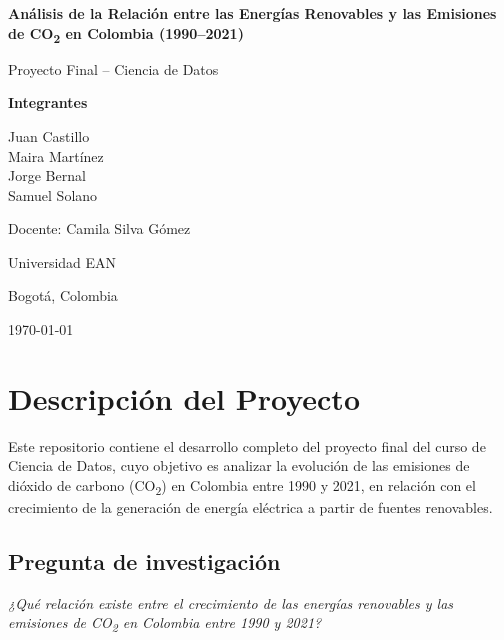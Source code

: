 \documentclass[11pt]{article}
\begin{document}
\begin{titlepage}
    \centering
    \vspace*{2cm}
    {\Huge\bfseries\color{primario} Análisis de la Relación entre las Energías Renovables y las Emisiones de CO\textsubscript{2} en Colombia (1990--2021)\par}
    \vspace{1.5cm}
    {\Large Proyecto Final -- Ciencia de Datos\par}
    \vspace{2cm}
    {\large\bfseries Integrantes\par}
    \vspace{0.3cm}
    {\large
    Juan Castillo \\
    Maira Martínez \\
    Jorge Bernal \\
    Samuel Solano \par}
    \vspace{2cm}
    {\large Docente: Camila Silva Gómez\par}
    \vspace{0.3cm}
    {\large Universidad EAN\par}
    \vspace{0.3cm}
    {\large Bogotá, Colombia \par}
    \vfill
    {\large \today\par}
\end{titlepage}

\section{Descripción del Proyecto}

Este repositorio contiene el desarrollo completo del proyecto final del curso de Ciencia de Datos, cuyo objetivo es analizar la evolución de las emisiones de dióxido de carbono (CO\textsubscript{2}) en Colombia entre 1990 y 2021, en relación con el crecimiento de la generación de energía eléctrica a partir de fuentes renovables.

\subsection*{Pregunta de investigación}
\textit{¿Qué relación existe entre el crecimiento de las energías renovables y las emisiones de CO\textsubscript{2} en Colombia entre 1990 y 2021?}
\end{document}
